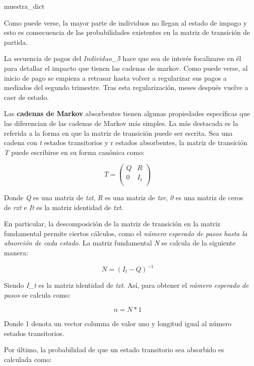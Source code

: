 \documentclass[
  a4paper,
  DIV=11,
  numbers=noendperiod]{scrreprt}
\newenvironment{Shaded}{\begin{snugshade}}{\end{snugshade}}
\newcommand{\NormalTok}[1]{#1}
\begin{document}
\begin{Shaded}
\begin{Highlighting}[numbers=left,,]
\NormalTok{muestra\_dict}
\end{Highlighting}
\end{Shaded}

Como puede verse, la mayor parte de individuos no llegan al estado de
impago y esto es consecuencia de las probabilidades existentes en la
matriz de transición de partida.

La secuencia de pagos del \emph{Individuo\_5} hace que sea de interés
focalizarse en él para detallar el impacto que tienen las cadenas de
markov. Como puede verse, al inicio de pago se empieza a retrasar hasta
volver a regularizar sus pagos a mediados del segundo trimestre. Tras
esta regularización, meses después vuelve a caer de estado.

Las \textbf{cadenas de Markov} absorbentes tienen algunas propiedades
específicas que las diferencian de las cadenas de Markov más simples. La
más destacada es la referida a la forma en que la matriz de transición
puede ser escrita. Sea una cadena con \emph{t} estados transitorios y r
estados absorbentes, la matriz de transición \emph{T} puede escribirse
en su forma canónica como:

\[
T = \begin{pmatrix}
Q & R \\
0 & I_t \\
\end{pmatrix}
\]

Donde \emph{Q} es una matriz de \emph{txt}, \emph{R} es una matriz de
\emph{txr}, \emph{0} es una matriz de ceros de \emph{rxt} e \emph{It} es
la matriz identidad de \emph{txt}.

En particular, la descomposición de la matriz de transición en la matriz
fundamental permite ciertos cálculos, como el \emph{número esperado de
pasos hasta la absorción de cada estado}. La matriz fundamental \emph{N}
se calcula de la siguiente manera:

\[
N= (I_t-Q)^{-1}
\]

Siendo \emph{I\_t} es la matriz identidad de \emph{txt}. Así, para
obtener el \emph{número esperado de pasos} se calcula como:

\[
n= N*1
\]

Donde 1 denota un vector columna de valor uno y longitud igual al número
estados transitorios.

Por último, la probabilidad de que un estado transitorio sea absorbido
es calculada como:
\end{document}
